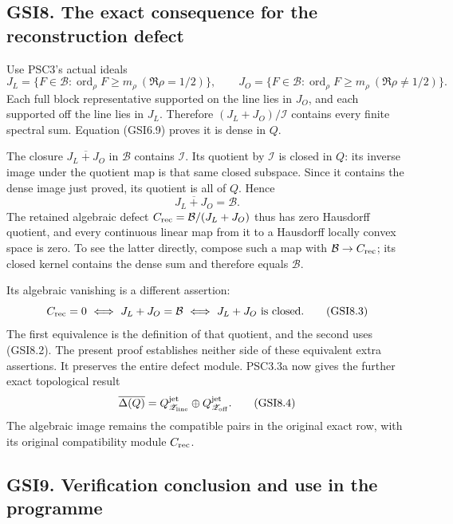 \subsection{GSI8. The exact consequence for the reconstruction
defect}\label{gsi8.-the-exact-consequence-for-the-reconstruction-defect}

Use PSC3's actual ideals \[
J_L=\{F\in\mathcal B:\operatorname{ord}_\rho F\ge m_\rho
\ (\Re\rho=1/2)\},\qquad
J_O=\{F\in\mathcal B:\operatorname{ord}_\rho F\ge m_\rho
\ (\Re\rho\ne1/2)\}.
\tag{GSI8.1}
\] Each full block representative supported on the line lies in \(J_O\),
and each supported off the line lies in \(J_L\). Therefore
\((J_L+J_O)/\mathcal I\) contains every finite spectral sum. Equation
(GSI6.9) proves it is dense in \(Q\).

The closure \(\overline{J_L+J_O}\) in \(\mathcal B\) contains
\(\mathcal I\). Its quotient by \(\mathcal I\) is closed in \(Q\): its
inverse image under the quotient map is that same closed subspace. Since
it contains the dense image just proved, its quotient is all of \(Q\).
Hence \[
\boxed{\overline{J_L+J_O}=\mathcal B.}
\tag{GSI8.2}
\] The retained algebraic defect \(C_{\rm rec}=\mathcal B/(J_L+J_O)\)
thus has zero Hausdorff quotient, and every continuous linear map from
it to a Hausdorff locally convex space is zero. To see the latter
directly, compose such a map with \(\mathcal B\to C_{\rm rec}\); its
closed kernel contains the dense sum and therefore equals
\(\mathcal B\).

Its algebraic vanishing is a different assertion: \[
C_{\rm rec}=0
\ \Longleftrightarrow\ J_L+J_O=\mathcal B
\ \Longleftrightarrow\ J_L+J_O\text{ is closed}.
\tag{GSI8.3}
\] The first equivalence is the definition of that quotient, and the
second uses (GSI8.2). The present proof establishes neither side of
these equivalent extra assertions. It preserves the entire defect
module. PSC3.3a now gives the further exact topological result \[
\overline{\Delta(Q)}
=Q_{\mathscr Z_{\rm line}}^{\rm jet}
\oplus Q_{\mathscr Z_{\rm off}}^{\rm jet}.
\tag{GSI8.4}
\] The algebraic image remains the compatible pairs in the original
exact row, with its original compatibility module \(C_{\rm rec}\).

\subsection{GSI9. Verification conclusion and use in the
programme}\label{gsi9.-verification-conclusion-and-use-in-the-programme}

